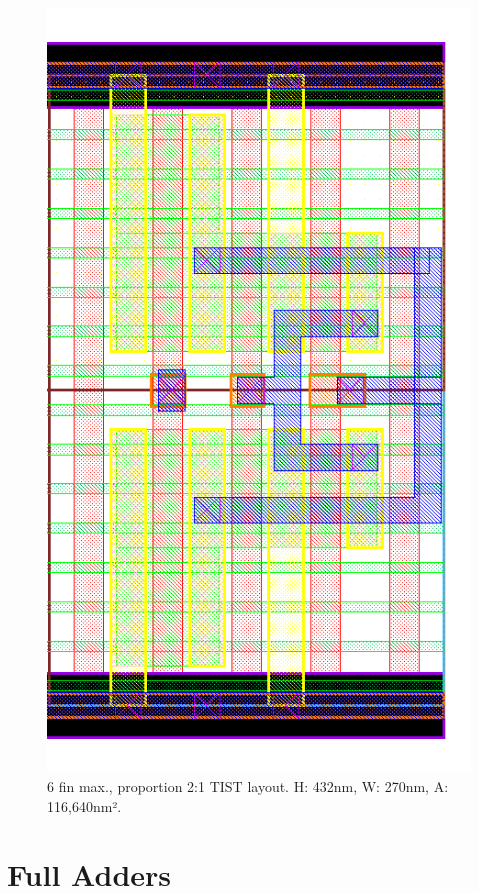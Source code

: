 \documentclass[diss,pgmicro,english]{iiufrgs}
\begin{document}
\begin{figure}[]
\centering
\includegraphics[width=\textwidth,height=\textheight,keepaspectratio]{TIST6F3F.png}
\caption{6 fin max., proportion 2:1 TIST layout. H: 432nm, W: 270nm, A: 116,640nm². }
\label{fig:TIST5F}
\end{figure}





\chapter{Full Adders}
\end{document}
